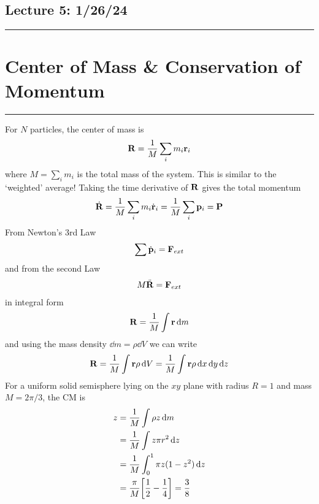 \documentclass[../main.tex]{subfiles}
\begin{document}
\pagebreak
\subsection*{Lecture 5: \hfill  1/26/24}
\hrule \vspace{10px}
\section{Center of Mass \& Conservation of Momentum}
\hrule \vspace{10px}

For $N$ particles, the center of mass is
\begin{align*}
    \vb{R} = \frac{1}{M} \sum_i m_i \vb{r}_i
\end{align*}
where $M = \sum_i m_i$ is the total mass of the system. This is similar to the `weighted' average!
Taking the time derivative of $\vb{R}$ gives the total momentum
\begin{align*}
    \dot{\vb{R}} = \frac{1}{M} \sum_i m_i \dot{\vb{r}}_i = \frac{1}{M} \sum_i \vb{p}_i = \vb{P}
\end{align*}
From Newton's 3rd Law
\begin{align*}
    \sum \dot{\vb{p}}_i = \vb{F}_{ext}
\end{align*}
and from the second Law
\begin{align*}
    M \ddot{\vb{R}} = \vb{F}_{ext}
\end{align*}
in integral form 
\begin{align*}
    \vb{R} = \frac{1}{M} \int \vb{r} \dd{m}
\end{align*}
and using the mass density $\dd{m} = \rho \dd{V}$ we can write
\begin{align*}
    \vb{R} = \frac{1}{M} \int \vb{r} \rho \dd{V} = \frac{1}{M} \int \vb{r} \rho \dd{x} \dd{y} \dd{z}
\end{align*}
For a uniform solid semisphere lying on the $xy$ plane with radius $R=1$ and mass $M = 2\pi/3$, the
CM is 
\begin{align*}
    z &= \frac{1}{M} \int \rho z \dd{m} \\
    &= \frac{1}{M} \int z\pi r^2 \dd{z} \\
    &= \frac{1}{M} \int_0^1 \pi z (1 - z^2) \dd{z} \\
    &= \frac{\pi}{M} \qt[\frac{1}{2} - \frac{1}{4}] = \frac{3}{8}
\end{align*}
\end{document}
